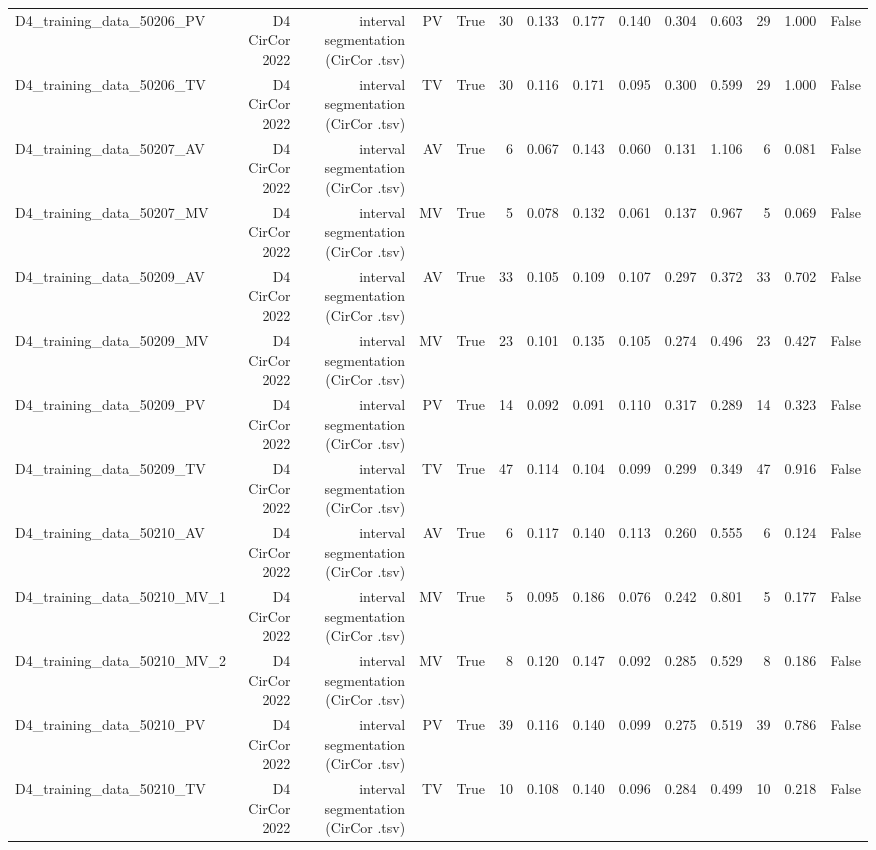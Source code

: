 \begin{table}[htbp]
\begin{tabular}{lrrrrrrrrrrrrr}
    D4\_training\_data\_50206\_PV & D4 CirCor 2022 & interval segmentation (CirCor .tsv) & PV & True & 30 & 0.133 & 0.177 & 0.140 & 0.304 & 0.603 & 29 & 1.000 & False \\
    D4\_training\_data\_50206\_TV & D4 CirCor 2022 & interval segmentation (CirCor .tsv) & TV & True & 30 & 0.116 & 0.171 & 0.095 & 0.300 & 0.599 & 29 & 1.000 & False \\
    D4\_training\_data\_50207\_AV & D4 CirCor 2022 & interval segmentation (CirCor .tsv) & AV & True & 6 & 0.067 & 0.143 & 0.060 & 0.131 & 1.106 & 6 & 0.081 & False \\
    D4\_training\_data\_50207\_MV & D4 CirCor 2022 & interval segmentation (CirCor .tsv) & MV & True & 5 & 0.078 & 0.132 & 0.061 & 0.137 & 0.967 & 5 & 0.069 & False \\
    D4\_training\_data\_50209\_AV & D4 CirCor 2022 & interval segmentation (CirCor .tsv) & AV & True & 33 & 0.105 & 0.109 & 0.107 & 0.297 & 0.372 & 33 & 0.702 & False \\
    D4\_training\_data\_50209\_MV & D4 CirCor 2022 & interval segmentation (CirCor .tsv) & MV & True & 23 & 0.101 & 0.135 & 0.105 & 0.274 & 0.496 & 23 & 0.427 & False \\
    D4\_training\_data\_50209\_PV & D4 CirCor 2022 & interval segmentation (CirCor .tsv) & PV & True & 14 & 0.092 & 0.091 & 0.110 & 0.317 & 0.289 & 14 & 0.323 & False \\
    D4\_training\_data\_50209\_TV & D4 CirCor 2022 & interval segmentation (CirCor .tsv) & TV & True & 47 & 0.114 & 0.104 & 0.099 & 0.299 & 0.349 & 47 & 0.916 & False \\
    D4\_training\_data\_50210\_AV & D4 CirCor 2022 & interval segmentation (CirCor .tsv) & AV & True & 6 & 0.117 & 0.140 & 0.113 & 0.260 & 0.555 & 6 & 0.124 & False \\
    D4\_training\_data\_50210\_MV\_1 & D4 CirCor 2022 & interval segmentation (CirCor .tsv) & MV & True & 5 & 0.095 & 0.186 & 0.076 & 0.242 & 0.801 & 5 & 0.177 & False \\
    D4\_training\_data\_50210\_MV\_2 & D4 CirCor 2022 & interval segmentation (CirCor .tsv) & MV & True & 8 & 0.120 & 0.147 & 0.092 & 0.285 & 0.529 & 8 & 0.186 & False \\
    D4\_training\_data\_50210\_PV & D4 CirCor 2022 & interval segmentation (CirCor .tsv) & PV & True & 39 & 0.116 & 0.140 & 0.099 & 0.275 & 0.519 & 39 & 0.786 & False \\
    D4\_training\_data\_50210\_TV & D4 CirCor 2022 & interval segmentation (CirCor .tsv) & TV & True & 10 & 0.108 & 0.140 & 0.096 & 0.284 & 0.499 & 10 & 0.218 & False \\

\end{tabular}
\end{table}
